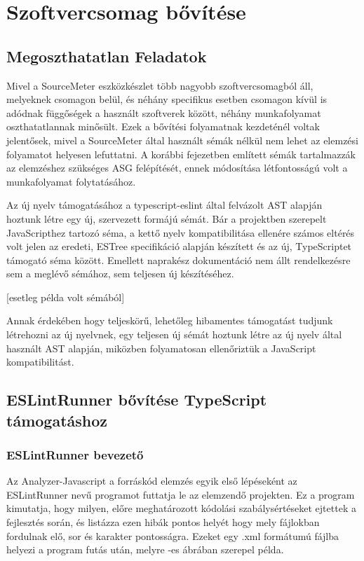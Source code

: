 \chapter{Szoftvercsomag bővítése}
\label{chap:fejezet4}

\section{Megoszthatatlan Feladatok}

Mivel a SourceMeter eszközkészlet több nagyobb szoftvercsomagból áll, melyeknek csomagon belül, és néhány specifikus esetben csomagon kívül is adódnak függőségek a használt szoftverek között, néhány munkafolyamat oszthatatlannak minősült. Ezek a bővítési folyamatnak kezdeténél voltak jelentősek, mivel a SourceMeter által használt sémák nélkül nem lehet az elemzési folyamatot helyesen lefuttatni. A korábbi fejezetben említett sémák tartalmazzák az elemzéshez szükséges ASG felépítését, ennek módosítása létfontosságú volt a munkafolyamat folytatásához.

Az új nyelv támogatásához a typescript-eslint által felvázolt AST alapján hoztunk létre egy új, szervezett formájú sémát. Bár a projektben szerepelt JavaScripthez tartozó séma, a kettő nyelv kompatibilitása ellenére számos eltérés volt jelen az eredeti, ESTree specifikáció alapján készített és az új, TypeScriptet támogató séma között. Emellett naprakész dokumentáció nem állt rendelkezésre sem a meglévő sémához, sem teljesen új készítéséhez.

[esetleg példa volt sémából] 

Annak érdekében hogy teljeskörű, lehetőleg hibamentes támogatást tudjunk létrehozni az új nyelvnek, egy teljesen új sémát hoztunk létre az új nyelv által használt AST alapján, miközben folyamatosan ellenőriztük a JavaScript kompatibilitást. 

\section{ESLintRunner bővítése TypeScript támogatáshoz}

\subsection{ESLintRunner bevezető}
Az Analyzer-Javascript a forráskód elemzés egyik első lépéseként az ESLintRunner nevű programot futtatja le az elemzendő projekten. Ez a program kimutatja, hogy milyen, előre meghatározott kódolási szabálysértéseket ejtettek a fejlesztés során, és listázza ezen hibák pontos helyét hogy mely fájlokban fordulnak elő, sor és karakter pontosságra. Ezeket egy .xml formátumú fájlba helyezi a program futás után, melyre -es ábrában szerepel példa.

